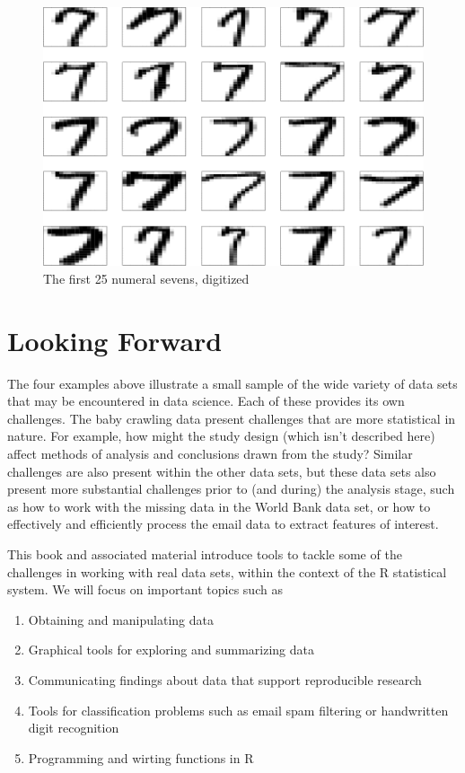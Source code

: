 \documentclass[]{krantz}
\providecommand{\tightlist}{%
  \setlength{\itemsep}{0pt}\setlength{\parskip}{0pt}}
\begin{document}
\begin{figure}
\centering
\includegraphics{bookdown_files/figure-latex/25Sevens-1.pdf}
\caption{\label{fig:25Sevens}The first 25 numeral sevens, digitized}
\end{figure}

\hypertarget{looking-forward}{%
\section{Looking Forward}\label{looking-forward}}

The four examples above illustrate a small sample of the wide variety of data sets that may be encountered in data science. Each of these provides its own challenges. The baby crawling data present challenges that are more statistical in nature. For example, how might the study design (which isn't described here) affect methods of analysis and conclusions drawn from the study? Similar challenges are also present within the other data sets, but these data sets also present more substantial challenges prior to (and during) the analysis stage, such as how to work with the missing data in the World Bank data set, or how to effectively and efficiently process the email data to extract features of interest.

This book and associated material introduce tools to tackle some of the challenges in working with real data sets, within the context of the R statistical system. We will focus on important topics such as

\begin{enumerate}
\def\labelenumi{\arabic{enumi}.}
\tightlist
\item
  Obtaining and manipulating data
\item
  Graphical tools for exploring and summarizing data
\item
  Communicating findings about data that support reproducible research
\item
  Tools for classification problems such as email spam filtering or handwritten digit recognition
\item
  Programming and wirting functions in R
\end{enumerate}
\end{document}
